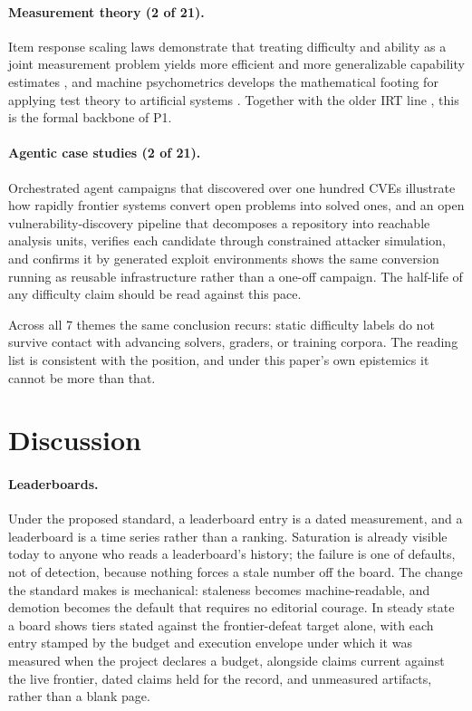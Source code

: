 \documentclass[11pt]{article}
\begin{document}
\paragraph{Measurement theory (2 of 21).}
Item response scaling laws demonstrate that treating difficulty and ability as a joint measurement problem yields more efficient and more generalizable capability estimates \citep{truong2026irt}, and machine psychometrics develops the mathematical footing for applying test theory to artificial systems \citep{bogdan2026psychometrics}. Together with the older IRT line \citep{lalor2016irt}, this is the formal backbone of P1.

\paragraph{Agentic case studies (2 of 21).}
Orchestrated agent campaigns that discovered over one hundred CVEs \citep{zhang2026titanca} illustrate how rapidly frontier systems convert open problems into solved ones, and an open vulnerability-discovery pipeline that decomposes a repository into reachable analysis units, verifies each candidate through constrained attacker simulation, and confirms it by generated exploit environments \citep{korda2026openant} shows the same conversion running as reusable infrastructure rather than a one-off campaign. The half-life of any difficulty claim should be read against this pace.

Across all 7 themes the same conclusion recurs: static difficulty labels do not survive contact with advancing solvers, graders, or training corpora. The reading list is consistent with the position, and under this paper's own epistemics it cannot be more than that.

\section{Discussion}
\label{sec:discussion}

\paragraph{Leaderboards.}
Under the proposed standard, a leaderboard entry is a dated measurement, and a leaderboard is a time series rather than a ranking. Saturation is already visible today to anyone who reads a leaderboard's history; the failure is one of defaults, not of detection, because nothing forces a stale number off the board. The change the standard makes is mechanical: staleness becomes machine-readable, and demotion becomes the default that requires no editorial courage. In steady state a board shows tiers stated against the frontier-defeat target alone, with each entry stamped by the budget and execution envelope under which it was measured when the project declares a budget, alongside claims current against the live frontier, dated claims held for the record, and unmeasured artifacts, rather than a blank page.
\end{document}
